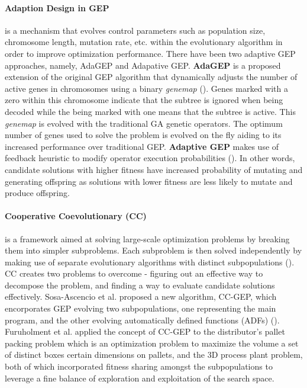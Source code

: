 \parbreak\noindent \paragraph{Adaption Design in GEP} is a mechanism that evolves control parameters such as population size, chromosome length, mutation rate, etc. within the evolutionary algorithm in order to improve optimization performance. There have been two adaptive GEP approaches, namely, AdaGEP and Adapative GEP. \textbf{AdaGEP} is a proposed extension of the original GEP algorithm that dynamically adjusts the number of active genes in chromosomes using a binary \textit{genemap} (\cite{bautu2007adagep}). Genes marked with a zero within this chromosome indicate that the subtree is ignored when being decoded while the being marked with one means that the subtree is active. This \textit{genemap} is evolved with the traditional GA genetic operators. The optimum number of genes used to solve the problem is evolved on the fly aiding to its increased performance over traditional GEP. \textbf{Adaptive GEP} makes use of feedback heuristic to modify operator execution probabilities (\cite{mwaura2009adaptive}). In other words, candidate solutions with higher fitness have increased probability of mutating and generating offspring as solutions with lower fitness are less likely to mutate and produce offspring.

\parbreak\noindent \paragraph{Cooperative Coevolutionary (CC)} is a framework aimed at solving large-scale optimization problems by breaking them into simpler subproblems. Each subproblem is then solved independently by making use of separate evolutionary algorithms with distinct subpopulations (\cite{zhong2017gene}). CC creates two problems to overcome - figuring out an effective way to decompose the problem, and finding a way to evaluate candidate solutions effectively. Sosa-Ascencio et al. proposed a new algorithm, CC-GEP, which encorporates GEP evolving two subpopulations, one representing the main program, and the other evolving automatically defined functions (ADFs) (\cite{zhong2017gene}). Furuholment et al. applied the concept of CC-GEP to the distributor's pallet packing problem which is an optimization problem to maximize the volume a set of distinct boxes certain dimensions on pallets, and the 3D process plant problem, both of which incorporated fitness sharing amongst the subpopulations to leverage a fine balance of exploration and exploitation of the search space.


